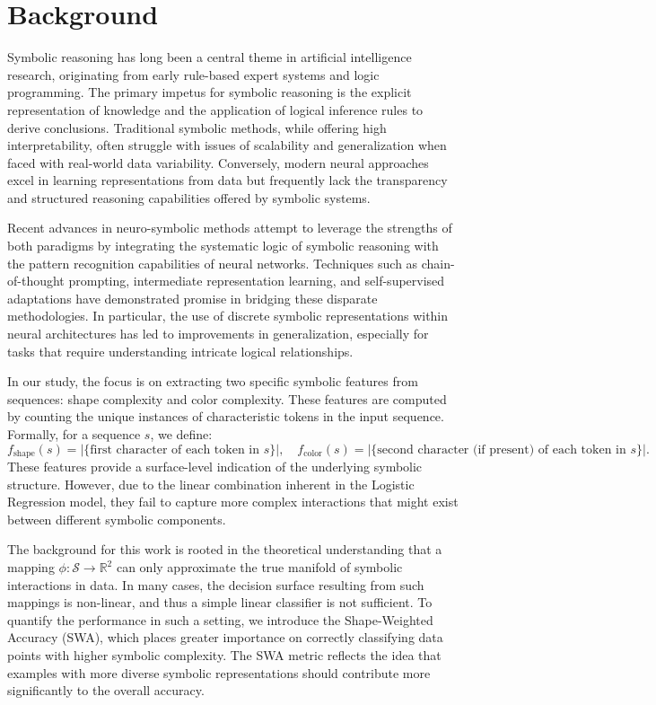 \documentclass{article}
\begin{document}
\section{Background}
Symbolic reasoning has long been a central theme in artificial intelligence research, originating from early rule-based expert systems and logic programming. The primary impetus for symbolic reasoning is the explicit representation of knowledge and the application of logical inference rules to derive conclusions. Traditional symbolic methods, while offering high interpretability, often struggle with issues of scalability and generalization when faced with real-world data variability. Conversely, modern neural approaches excel in learning representations from data but frequently lack the transparency and structured reasoning capabilities offered by symbolic systems.

Recent advances in neuro-symbolic methods attempt to leverage the strengths of both paradigms by integrating the systematic logic of symbolic reasoning with the pattern recognition capabilities of neural networks. Techniques such as chain-of-thought prompting, intermediate representation learning, and self-supervised adaptations have demonstrated promise in bridging these disparate methodologies. In particular, the use of discrete symbolic representations within neural architectures has led to improvements in generalization, especially for tasks that require understanding intricate logical relationships.

In our study, the focus is on extracting two specific symbolic features from sequences: shape complexity and color complexity. These features are computed by counting the unique instances of characteristic tokens in the input sequence. Formally, for a sequence \( s \), we define:
\[
f_{\text{shape}}(s)=\left|\{ \text{first character of each token in } s\}\right|, \quad f_{\text{color}}(s)=\left|\{ \text{second character (if present) of each token in } s\}\right|.
\]
These features provide a surface-level indication of the underlying symbolic structure. However, due to the linear combination inherent in the Logistic Regression model, they fail to capture more complex interactions that might exist between different symbolic components.

The background for this work is rooted in the theoretical understanding that a mapping \(\phi: \mathcal{S} \rightarrow \mathbb{R}^2\) can only approximate the true manifold of symbolic interactions in data. In many cases, the decision surface resulting from such mappings is non-linear, and thus a simple linear classifier is not sufficient. To quantify the performance in such a setting, we introduce the Shape-Weighted Accuracy (SWA), which places greater importance on correctly classifying data points with higher symbolic complexity. The SWA metric reflects the idea that examples with more diverse symbolic representations should contribute more significantly to the overall accuracy.
\end{document}
